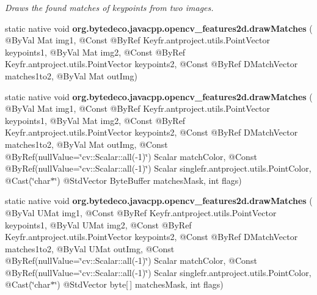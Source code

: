 \begin{DoxyCompactItemize}
\begin{DoxyCompactList}\small\item\em Draws the found matches of keypoints from two images. \end{DoxyCompactList}\item 
\mbox{\label{group__features2d__draw_ga0fa490aab35ddb31aa026268fc47ea13}} 
static native void {\bfseries org.\+bytedeco.\+javacpp.\+opencv\+\_\+features2d.\+draw\+Matches} ( @By\+Val Mat img1, @Const @By\+Ref Key\+fr.antproject.utils.Point\+Vector keypoints1, @By\+Val Mat img2, @Const @By\+Ref Key\+fr.antproject.utils.Point\+Vector keypoints2, @Const @By\+Ref D\+Match\+Vector matches1to2, @By\+Val Mat out\+Img)
\item 
\mbox{\label{group__features2d__draw_ga05c394d1f12608d241319daa6fa22089}} 
static native void {\bfseries org.\+bytedeco.\+javacpp.\+opencv\+\_\+features2d.\+draw\+Matches} ( @By\+Val Mat img1, @Const @By\+Ref Key\+fr.antproject.utils.Point\+Vector keypoints1, @By\+Val Mat img2, @Const @By\+Ref Key\+fr.antproject.utils.Point\+Vector keypoints2, @Const @By\+Ref D\+Match\+Vector matches1to2, @By\+Val Mat out\+Img, @Const @By\+Ref(null\+Value=\char`\"{}cv\+::\+Scalar\+::all(-\/1)\char`\"{}) Scalar match\+Color, @Const @By\+Ref(null\+Value=\char`\"{}cv\+::\+Scalar\+::all(-\/1)\char`\"{}) Scalar single\+fr.antproject.utils.Point\+Color, @Cast(\char`\"{}char$\ast$\char`\"{}) @Std\+Vector Byte\+Buffer matches\+Mask, int flags)
\item 
\mbox{\label{group__features2d__draw_gacf3335a0fdfedc2dcb6cc349c636e80e}} 
static native void {\bfseries org.\+bytedeco.\+javacpp.\+opencv\+\_\+features2d.\+draw\+Matches} ( @By\+Val U\+Mat img1, @Const @By\+Ref Key\+fr.antproject.utils.Point\+Vector keypoints1, @By\+Val U\+Mat img2, @Const @By\+Ref Key\+fr.antproject.utils.Point\+Vector keypoints2, @Const @By\+Ref D\+Match\+Vector matches1to2, @By\+Val U\+Mat out\+Img, @Const @By\+Ref(null\+Value=\char`\"{}cv\+::\+Scalar\+::all(-\/1)\char`\"{}) Scalar match\+Color, @Const @By\+Ref(null\+Value=\char`\"{}cv\+::\+Scalar\+::all(-\/1)\char`\"{}) Scalar single\+fr.antproject.utils.Point\+Color, @Cast(\char`\"{}char$\ast$\char`\"{}) @Std\+Vector byte\mbox{[}$\,$\mbox{]} matches\+Mask, int flags)
\item 
\mbox{\label{group__features2d__draw_ga2b2c2e3b61f07cd7e26bebe796dd0090}} 

\end{DoxyCompactItemize}
